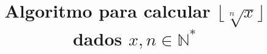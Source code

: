 \title{%
  \texorpdfstring{%
    Algoritmo para calcular $\lfloor \sqrt[n]{x} \rfloor$
    dados $x, n \in \mathds{N}^*$%
  }{%
    Algoritmo para calcular o chão da raiz n-ésima de x
    dados inteiros positivos x e n%
  }%
}
